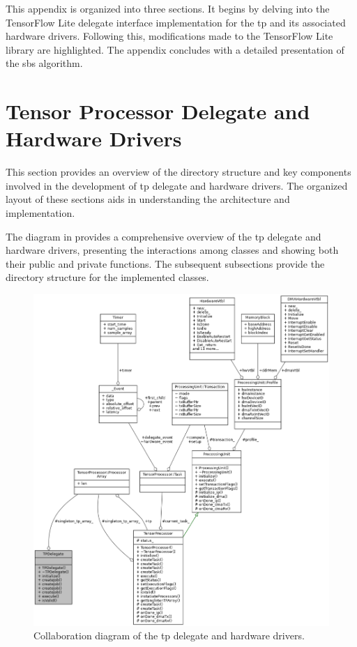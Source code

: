 \minitoc
This appendix is organized into three sections. It begins by delving into the TensorFlow Lite delegate interface implementation for the \gls{tp} and its associated hardware drivers. Following this, modifications made to the TensorFlow Lite library are highlighted. The appendix concludes with a detailed presentation of the \gls{sbs} algorithm.
\section{Tensor Processor Delegate and Hardware Drivers}
\label{chap:appendix_delegate}
This section provides an overview of the directory structure and key components involved in the development of \gls{tp} delegate and hardware drivers. The organized layout of these sections aids in understanding the architecture and implementation.

The diagram in  provides a comprehensive overview of the \gls{tp} delegate and hardware drivers, presenting the interactions among classes and showing both their public and private functions. The subsequent subsections provide the directory structure for the implemented classes.

\begin{figure}[h!]
	\centering
	\includegraphics[width=\textwidth]{./figures/class_t_p_delegate__coll__graph.png}
	\caption{Collaboration diagram of the \gls{tp} delegate and hardware drivers.}
	\label{fig:sw_tp_delegate_diagram_appendix}
\end{figure}

